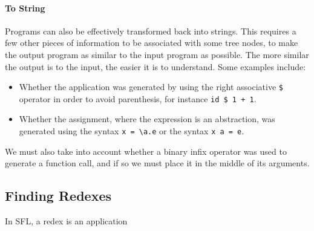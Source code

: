 \paragraph{To String} \label{paragraph:to_string} Programs can also be effectively transformed back into strings. This requires a few other pieces of information to be associated with some tree nodes, to make the output program as similar to the input program as possible. The more similar the output is to the input, the easier it is to understand. Some examples include:
\begin{itemize}
    \item Whether the application was generated by using the right associative \verb|$| operator in order to avoid parenthesis, for instance \verb|id $ 1 + 1|. 
    \item Whether the assignment, where the expression is an abstraction, was generated using the syntax \verb|x = \a.e| or the syntax \verb|x a = e|. 
\end{itemize}
We must also take into account whether a binary infix operator was used to generate a function call, and if so we must place it in the middle of its arguments. 


\subsection{Finding Redexes}
In SFL, a redex is an application 

